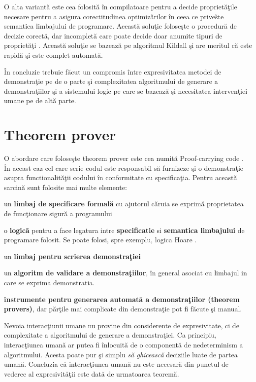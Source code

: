 O alta variant\u a este cea folosit\u a  \^ in compilatoare pentru a decide propriet\u a\c tile necesare pentru a asigura corectitudinea optimiz\u arilor  \^ in ceea ce prive\u ste semantica limbajului de programare. Aceast\u a solu\c tie folose\c ste o procedur\u a de decizie corect\u a, dar incomplet\u a care poate decide doar anumite tipuri de propriet\u a\c ti \citep{1095594}. Aceast\u a solu\c tie se bazeaz\u a pe algoritmul Kildall \c si are meritul c\u a este rapid\u a \c si este complet automat\u a.

\^ In concluzie trebuie f\u acut un compromis  \^ intre expresivitatea metodei de demonstra\c tie pe de o parte \c si complexitatea algoritmului de generare a demonstra\c tiilor \c si a sistemului logic pe care se bazeaz\u a \c si necesitatea interven\c tiei umane pe de alt\u a parte.

\section{Theorem prover}

O abordare care folose\c ste theorem prover este cea numit\u a Proof-carrying code \citep{ATTAPL}.  \^ In aceast caz cel care scrie codul este responsabil s\u a furnizeze \c si o demonstra\c tie asupra functionalit\u a\c tii codului  \^ in conformitate cu specifica\c tia. Pentru aceast\u a sarcin\u a sunt folosite mai multe elemente:

\begin{itemize*}
  \item un \textbf{limbaj de specificare formal\u a} cu ajutorul c\u aruia se exprim\u a proprietatea de func\-\c ti\-o\-na\-re sigur\u a a programului
  \item o \textbf{logic\u a} pentru a face legatura intre \textbf{specificatie} si \textbf{semantica limbajului} de programare folosit. Se poate folosi, spre exemplu, logica Hoare \citep{363259}.
  \item un \textbf{limbaj pentru scrierea demonstra\c tiei}
  \item un \textbf{algoritm de validare a demonstra\c tiilor},  \^ in general asociat cu limbajul in care se exprima demonstratia.
  \item \textbf{instrumente pentru generarea automat\u a a demonstra\c tiilor (theorem provers)}, dar p\u ar\c tile mai complicate din demonstra\c tie pot fi f\u acute \c si manual.
\end{itemize*}
\done{}

Nevoia interac\c tiunii umane nu provine din considerente de expresivitate, ci de complexitate a algoritmului de generare a demonstra\c tiei. Ca principiu, interac\c tiunea uman\u a ar putea fi  \^ inlocuit\u a de o component\u a de nedeterminism a algoritmului. Acesta poate pur  \c si simplu \emph{s\u a ghiceasc\u a} deciziile luate de partea uman\u a. Concluzia c\u a interac\c tiunea uman\u a nu este necesar\u a din punctul de vederee al expresivit\u a\c tii este dat\u a de urmatoarea teorem\u a.

